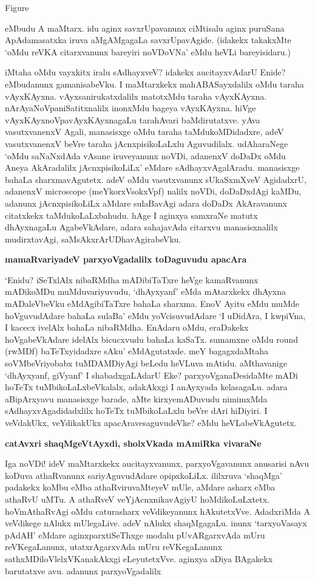 \begin{center}
{\rm Figure}
\end{center}

eMbudu A maMtarx. idu aginx savxrUpavanunx ciMtisalu aginx puruSana ApAdamasatxka iruva aMgAMgagaLa savxrUpavAgide. (idakekx takakxMte `oMdu reVKA citarxvanunx bareyiri noVDoVNa' eMdu heVLi bareyisidaru.)

iMtaha oMdu vayxkitx iralu sAdhayxveV? idakekx aucitayxvAdarU Enide? eMbudanunx gamanisabeVku. I maMtarxkekx mahABASayxdalilx oMdu taraha vAyxKAyxna. vAyxsanirukatxdalilx matotxMdu taraha vAyxKAyxna. nArAyaNoVpaniSatitxnalilx inonxMdu bageya vAyxKAyxna. hiVge vAyxKAyxnoVpavAyxKAyxnagaLu tarahAvari baMdirutatxve. yAva vasutxvanenxV Agali, manasisxge oMdu taraha taMdukoMDidadxre, adeV vasutxvanenxV beVre taraha jAcnxpisikoLaLxlu Aguvudilalx. udAharaNege `oMdu saNaNxdAda vAsane iruveyanunx noVDi, adanenxV doDaDx oMdu Aneya AkAradalilx jAcnxpisikoLiLx' eMdare sAdhayxvAgalAradu. manasisxge bahaLa sharxmavAgutetx. adeV  oMdu vasutxvanunx sUkaSxmXveV AgidadxrU, adanenxV {\rm microscope} (meYkorxVsokxVpf) nalilx noVDi, doDaDxdAgi kaMDu, adanunx jAcnxpisikoLiLx aMdare sulaBavAgi adara doDaDx AkAravanunx citatxkekx taMdukoLaLxbahudu. hAge I aginxya samxraNe matutx dhAyxnagaLu AgabeVkAdare, adara sahajavAda citarxvu manasisxnalilx mudirxtavAgi, saMsAkxrArUDhavAgirabeVku.

\noindent
{\bf\large{mamaRvariyadeV parxyoVgadalilx toDaguvudu apacAra}}\label{page209}

`Enidu? iSeTxlAlx nibaRMdha mADibiTaTxre heVge kamaRvanunx mADikoMDu muMduvariyuvudu, `dhAyxyanf' eMda mAtarxkekx dhAyxna mADaleVbeVku eMdAgibiTaTxre bahaLa sharxma. EnoV Ayitu eMdu muMde hoVguvudAdare bahaLa sulaBa' eMdu yoVcisuvudAdare `I uDidAra, I kwpiVna, I kacecx ivelAlx bahaLa nibaRMdha. EnAdaru oMdu, eraDakekx hoVgabeVkAdare idelAlx bicucxvudu bahaLa kaSaTx. sumamxne oMdu {\rm round} (rwMDf) baTeTxyidadxre sAku' eMdAgutatxde. meY bagagxdaMtaha soVMbeVriyobabx tuMDAMDiyAgi beLedu heVLuva mAtidu. aMthavanige `dhAyxyanf, giVyanf' I shabadxgaLAdarU Eke? parxyoVganaDesidaMte mADi hoTeTx tuMbikoLaLxbeVkalalx, adakAkxgi I anAyxyada kelasagaLu. adara aBipArxyavu manasisxge barade, aMte kirxyemADuvudu nimimxMda sAdhayxvAgadidadxlilx hoTeTx tuMbikoLaLxlu beVre dAri hiDiyiri. I veVdakUkx, veYdikakUkx apacAravesaguvudeVke? eMdu heVLabeVkAgutetx.

\noindent
{\bf\large{catAvxri shaqMgeVtAyxdi, sholxVkada mAmiRka vivaraNe}}\label{page209}

Iga noVDi! ideV maMtarxkekx aucitayxvanunx, parxyoVgavanunx anusarisi nAvu koDuva athaRvanunx sariyAguvudAdare opipxkoLiLx. ililxruva `shaqMga' padakekx koMbu eMba athaRviruvaMteyeV mUle, aMdare asharx eMba athaRvU uMTu. A athaRveV veYjAcnxnikavAgiyU hoMdikoLuLxtetx. hoVmAthaRvAgi oMdu caturasharx veVdikeyanunx hAkutetxVve. AdadxriMda A veVdikege nAlukx mUlegaLive. adeV nAlukx shaqMgagaLu. inunx `tarxyoVasayx pAdAH' eMdare aginxparxtiSeThxge modalu pUvARgarxvAda mUru reVKegaLanunx, utatxrAgarxvAda mUru reVKegaLanunx sathxMDiloVlelxVKanakAkxgi eLeyutetxVve. aginxya aDiya BAgakekx barutatxve avu. adanunx parxyoVgadalilx

